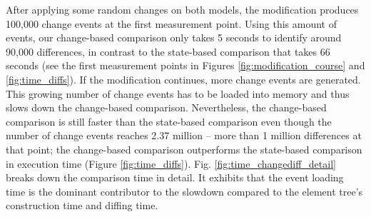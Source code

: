 \documentclass{jot}
\begin{document}
    After applying some random changes on both models, the modification produces 100,000 change events at the first measurement point. Using this amount of events, our change-based comparison only takes 5 seconds to identify around 90,000 differences, in contrast to the state-based comparison that takes 66 seconds (see the first measurement points in Figures \ref{fig:modification_course} and \ref{fig:time_diffs}). If the modification continues, more change events are generated. This growing number of change events has to be loaded into memory and thus slows down the change-based comparison. Nevertheless, the change-based comparison is still faster than the state-based comparison even though the number of change events reaches 2.37 million -- more than 1 million differences at that point; the change-based comparison outperforms the state-based comparison in execution time (Figure \ref{fig:time_diffs}). Fig. \ref{fig:time_changediff_detail} breaks down the comparison time in detail. It exhibits that the event loading time is the dominant contributor to the slowdown compared to the element tree's construction time and diffing time. 
    
\end{document}
